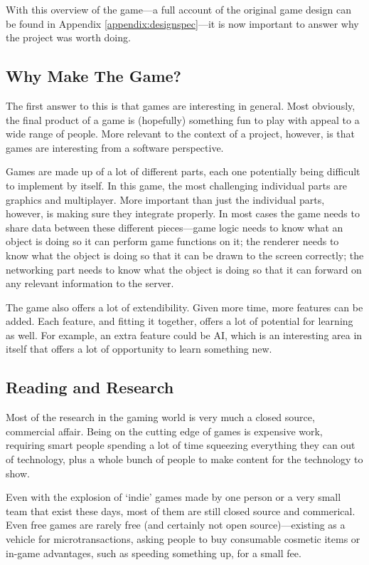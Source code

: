 With this overview of the game---a full account of the original game design can be found in Appendix \ref{appendix:designspec}---it is now important to answer why the project was worth doing.

\subsection{Why Make The Game?}
The first answer to this is that games are interesting in general. Most obviously, the final product of a game is (hopefully) something fun to play with appeal to a wide range of people. More relevant to the context of a project, however, is that games are interesting from a software perspective.

Games are made up of a lot of different parts, each one potentially being difficult to implement by itself. In this game, the most challenging individual parts are graphics and multiplayer. More important than just the individual parts, however, is making sure they integrate properly. In most cases the game needs to share data between these different pieces---game logic needs to know what an object is doing so it can perform game functions on it; the renderer needs to know what the object is doing so that it can be drawn to the screen correctly; the networking part needs to know what the object is doing so that it can forward on any relevant information to the server.

The game also offers a lot of extendibility. Given more time, more features can be added. Each feature, and fitting it together, offers a lot of potential for learning as well. For example, an extra feature could be AI, which is an interesting area in itself that offers a lot of opportunity to learn something new.

\subsection{Reading and Research}
Most of the research in the gaming world is very much a closed source, commercial affair. Being on the cutting edge of games is expensive work, requiring smart people spending a lot of time squeezing everything they can out of technology, plus a whole bunch of people to make content for the technology to show.

Even with the explosion of `indie' games made by one person or a very small team that exist these days, most of them are still closed source and commerical. Even free games are rarely free (and certainly not open source)---existing as a vehicle for microtransactions, asking people to buy consumable cosmetic items or in-game advantages, such as speeding something up, for a small fee.

